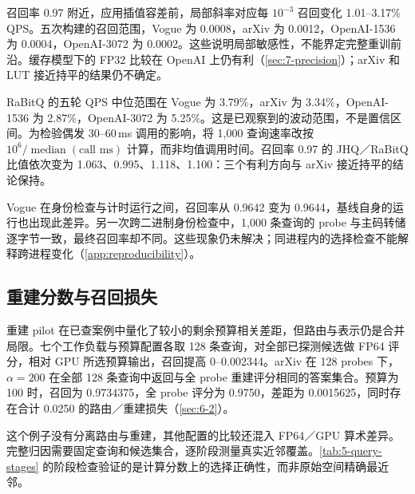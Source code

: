 召回率 0.97 附近，应用插值容差前，局部斜率对应每 $10^{-3}$ 召回变化 1.01--3.17\% QPS。五次构建的召回范围，Vogue 为 0.0008，arXiv 为 0.0012，OpenAI-1536 为 0.0004，OpenAI-3072 为 0.0002。这些说明局部敏感性，不能界定完整重训前沿。缓存模型下的 FP32 比较在 OpenAI 上仍有利（\cref{sec:7-precision}）；arXiv 和 LUT 接近持平的结果仍不确定。

RaBitQ 的五轮 QPS 中位范围在 Vogue 为 3.79\%，arXiv 为 3.34\%，OpenAI-1536 为 2.87\%，OpenAI-3072 为 5.25\%。这是已观察到的波动范围，不是置信区间。为检验偶发 30--60\,ms 调用的影响，将 1,000 查询速率改按 $10^6/\operatorname{median}(\text{call ms})$ 计算，而非均值调用时间。召回率 0.97 的 JHQ／RaBitQ 比值依次变为 1.063、0.995、1.118、1.100：三个有利方向与 arXiv 接近持平的结论保持。

Vogue 在身份检查与计时运行之间，召回率从 0.9642 变为 0.9644，基线自身的运行也出现此差异。另一次跨二进制身份检查中，1,000 条查询的 probe 与主码转储逐字节一致，最终召回率却不同。这些现象仍未解决；同进程内的选择检查不能解释跨进程变化（\cref{app:reproducibility}）。

\subsection{重建分数与召回损失}
\label{sec:7-recall-attribution}

重建 pilot 在已查案例中量化了较小的剩余预算相关差距，但路由与表示仍是合并局限。七个工作负载与预算配置各取 128 条查询，对全部已探测候选做 FP64 评分，相对 GPU 所选预算输出，召回提高 0--0.002344。arXiv 在 128 probes 下，$\alpha=200$ 在全部 128 条查询中返回与全 probe 重建评分相同的答案集合。预算为 100 时，召回为 0.9734375，全 probe 评分为 0.9750，差距为 0.0015625，同时存在合计 0.0250 的路由／重建损失（\cref{sec:6-2}）。

这个例子没有分离路由与重建，其他配置的比较还混入 FP64／GPU 算术差异。完整归因需要固定查询和候选集合，逐阶段测量真实近邻覆盖。\cref{tab:5-query-stages} 的阶段检查验证的是计算分数上的选择正确性，而非原始空间精确最近邻。
